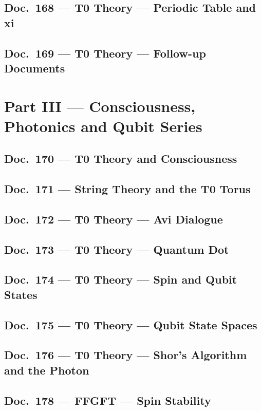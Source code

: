	\chapter{Doc.~168 --- T0 Theory — Periodic Table and xi}
	
	\chapter{Doc.~169 --- T0 Theory — Follow-up Documents}
	
	\part{Part III --- Consciousness, Photonics and Qubit Series}
	\chapter{Doc.~170 --- T0 Theory and Consciousness}
	
	\chapter{Doc.~171 --- String Theory and the T0 Torus}
	
	\chapter{Doc.~172 --- T0 Theory — Avi Dialogue}
	
	\chapter{Doc.~173 --- T0 Theory — Quantum Dot}
	
	\chapter{Doc.~174 --- T0 Theory — Spin and Qubit States}
	
	\chapter{Doc.~175 --- T0 Theory — Qubit State Spaces}
	
	\chapter{Doc.~176 --- T0 Theory — Shor's Algorithm and the Photon}
	
	\chapter{Doc.~178 --- FFGFT — Spin Stability}
	
